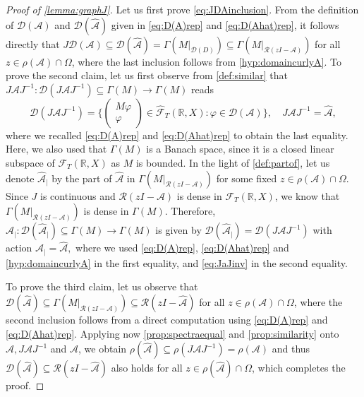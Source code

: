 \documentclass[english]{myarticle}
\begin{document}
\begin{sloppypar}
\begin{proof}[Proof of \cref{lemma:graphJ}]
Let us first prove \eqref{eq:JDAinclusion}. From the definition of $\mathcal{D}(\mathcal{A})$ and $\mathcal{D}(\hat{\mathcal{A}})$ given in \eqref{eq:D(A)rep} and \eqref{eq:D(Ahat)rep}, it follows directly that $J \mathcal{D}(\mathcal{A}) \subseteq \mathcal{D}(\hat{\mathcal{A}}) = \Gamma(M|_{\mathcal{D}(D)}) \subseteq \Gamma(M|_{\mathcal{R}(zI-\mathcal{A})})$ for all $z \in \rho(\mathcal{A}) \cap \Omega$, where the last inclusion follows from \ref{hyp:domaincurlyA}. To prove the second claim, let us first observe from \cref{def:similar} that $J\mathcal{A}J^{-1} : \mathcal{D}(J\mathcal{A}J^{-1}) \subseteq \Gamma(M) \to \Gamma(M)$ reads
\begin{equation} \label{eq:JaJinv}
    \mathcal{D}(J\mathcal{A}J^{-1}) = \bigg \{
    \begin{pmatrix}
        M \varphi \\
        \varphi
    \end{pmatrix}
    \in \hat{\mathcal{F}}_T(\mathbb{R},X) : \varphi \in \mathcal{D}(\mathcal{A}) \bigg \}, \quad J\mathcal{A}J^{-1}  = \hat{\mathcal{A}},
\end{equation}
where we recalled \eqref{eq:D(A)rep} and \eqref{eq:D(Ahat)rep} to obtain the last equality. Here, we also used that $\Gamma(M)$ is a Banach space, since it is a closed linear subspace of $\mathcal{F}_T(\mathbb{R},X)$ as $M$ is bounded. In the light of \cref{def:partof}, let us denote $\hat{\mathcal{A}}_{|}$ by the part of $\hat{\mathcal{A}}$ in $\Gamma(M|_{\mathcal{R}(zI-\mathcal{A})})$ for some fixed $z \in \rho(\mathcal{A}) \cap \Omega$. Since $J$ is continuous and $\mathcal{R}(zI-\mathcal{A})$ is dense in $\mathcal{F}_T(\mathbb{R},X)$, we know that $\Gamma(M|_{\mathcal{R}(zI-\mathcal{A})})$ is dense in $\Gamma(M)$. Therefore, $\hat{\mathcal{A}}_{|} : \mathcal{D}(\hat{\mathcal{A}}_{|}) \subseteq \Gamma(M) \to \Gamma(M)$ is given by $\mathcal{D}(\hat{\mathcal{A}}_{|}) = \mathcal{D}(J\mathcal{A}J^{-1})$ with action $\hat{\mathcal{A}}_{|} = \hat{\mathcal{A}},$ where we used \eqref{eq:D(A)rep}, \eqref{eq:D(Ahat)rep} and \ref{hyp:domaincurlyA} in the first equality, and \eqref{eq:JaJinv} in the second equality.

To prove the third claim, let us observe that $\mathcal{D}(\hat{\mathcal{A}}) \subseteq \Gamma(M|_{\mathcal{R}(zI-\mathcal{A})}) \subseteq \mathcal{R}(zI-\hat{\mathcal{A}})$ for all $z \in \rho(\mathcal{A}) \cap \Omega$, where the second inclusion follows from a direct computation using \eqref{eq:D(A)rep} and \eqref{eq:D(Ahat)rep}. Applying now \cref{prop:spectraequal} and \cref{prop:similarity} onto $\hat{\mathcal{A}}, J\mathcal{A}J^{-1}$ and $\mathcal{A}$, we obtain $\rho(\hat{\mathcal{A}}) \subseteq \rho(J\mathcal{A}J^{-1}) = \rho(\mathcal{A})$ and thus $\mathcal{D}(\hat{\mathcal{A}}) \subseteq \mathcal{R}(zI-\hat{\mathcal{A}})$  also holds for all $z \in \rho(\hat{\mathcal{A}}) \cap \Omega$, which completes the proof.
\end{proof}




\end{sloppypar}
\end{document}

